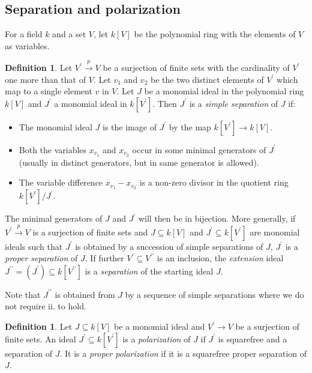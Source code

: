 \documentclass[10pt,a4paper]{article}
\theoremstyle{definition}
\newtheorem{defi}[cdrthm]{Definition}
\theoremstyle{remark}
\theoremstyle{plain}
\newcommand{\sus}{\subseteq}
\newcommand{\pil}{\rightarrow}
\newcommand{\mto}[1]{\stackrel{#1}\longrightarrow}
\begin{document}
\subsection{Separation and polarization}

For a field $k$ and a set $V$, let $k[V]$ be the polynomial ring with the
elements of $V$ as variables.
\begin{defi} \label{def:intro-sep}
Let $V^\prime \mto{p} V$ be a surjection of finite sets with the
cardinality of $V^\prime$ one more than that of $V$. Let $v_1$ and $v_2$
be the two distinct elements of $V^\prime$ which map to a single
element $v$ in $V$. Let $J$ be a monomial ideal in the polynomial ring
$k[V]$ and $J^\prime$ a monomial ideal in $k[V^\prime]$.
Then $J^\prime$ is a {\it simple separation} of $J$ if:
\begin{itemize}
\item[i.] The monomial ideal $J$ is the image of $J^\prime$ by the map
$k[V^\prime] \pil k[V]$.
\item[ii.] Both the variables $x_{v_1}$ and $x_{v_2}$ occur in some minimal
  generators of $J^\prime$ (usually in distinct generators, but in same
  generator is allowed).
\item[iii.] The variable difference $x_{v_1} - x_{v_2}$ is a non-zero divisor
in the quotient ring $k[V^\prime]/J^\prime$.
\end{itemize}

The minimal generators of $J$ and $J^\prime$ will then be
in bijection.
More generally, if $V^\prime \mto{p} V$ is a surjection of finite sets
and $J \sus k[V]$ and $J^\prime \sus k[V^\prime]$ are monomial ideals such
that $J^\prime$ is obtained by a succession of simple separations of $J$,
$J^\prime$ is a {\it proper separation} of $J$.
 If further $V^\prime \sus V^{\prime \prime}$ is an inclusion,
  the {\it extension} ideal $J^{\prime \prime} = (J^\prime) \sus k[V^{\prime \prime}]$
 is a {\it separation} of the starting ideal $J$.

\end{defi}

Note that $J^{\prime \prime}$ is obtained from $J$ by a sequence of
simple separations where we do not require ii. to hold. 

\begin{defi} \label{def:intro-pol}
  Let $J \sus k[V]$ be a monomial ideal and $V^\prime \pil V$ be a surjection
  of finite sets. An ideal $J^\prime \sus k[V^\prime]$ is a
  {\it polarization}
  of $J$ if $J^\prime$ is squarefree and a separation of $J$.
  It is a {\it proper polarization} if it is a squarefree proper
  separation of $J$. 
\end{defi}
\end{document}
